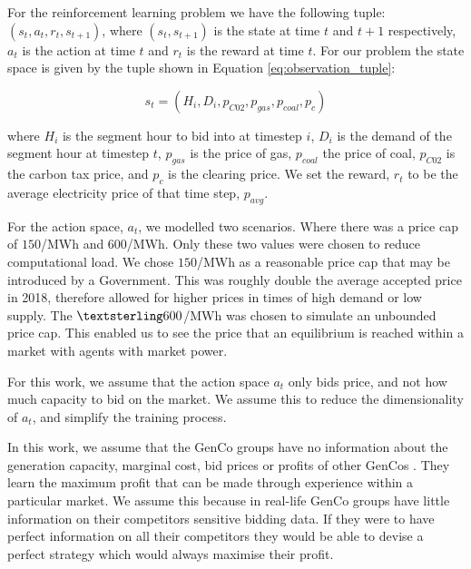 \documentclass[conference]{IEEEtran}
\begin{document}
For the reinforcement learning problem we have the following tuple: $(s_t,a_t,r_t,s_{t+1})$, where $(s_t, s_{t+1})$ is the state at time $t$ and $t+1$ respectively, $a_t$ is the action at time $t$ and $r_t$ is the reward at time $t$. For our problem the state space is given by the tuple shown in Equation \ref{eq:observation_tuple}:

\begin{equation}
\label{eq:observation_tuple}
	s_t=(H_i,D_i,p_{C02},p_{gas},p_{coal},p_{c})
\end{equation}

\noindent where $H_i$ is the segment hour to bid into at timestep $i$, $D_i$ is the demand of the segment hour at timestep $t$, $p_{gas}$ is the price of gas, $p_{coal}$ the price of coal, $p_{C02}$ is the carbon tax price, and $p_{c}$ is the clearing price. We set the reward, $r_t$ to be the average electricity price of that time step, $p_{avg}$.

For the action space, $a_t$, we modelled two scenarios. Where there was a price cap of \textsterling$150$/MWh and \textsterling$600$/MWh. Only these two values were chosen to reduce computational load. We chose \textsterling$150$/MWh as a reasonable price cap that may be introduced by a Government. This was roughly double the average accepted price in 2018, therefore allowed for higher prices in times of high demand or low supply. The $\textsterling 600$/MWh was chosen to simulate an unbounded price cap. This enabled us to see the price that an equilibrium is reached within a market with agents with market power. 

For this work, we assume that the action space $a_t$ only bids price, and not how much capacity to bid on the market. We assume this to reduce the dimensionality of $a_t$, and simplify the training process.

In this work, we assume that the GenCo groups have no information about the generation capacity, marginal cost, bid prices or profits of other GenCos \cite{EsmaeiliAliabadi2017}. They learn the maximum profit that can be made through experience within a particular market. We assume this because in real-life GenCo groups have little information on their competitors sensitive bidding data. If they were to have perfect information on all their competitors they would be able to devise a perfect strategy which would always maximise their profit.

\end{document}
